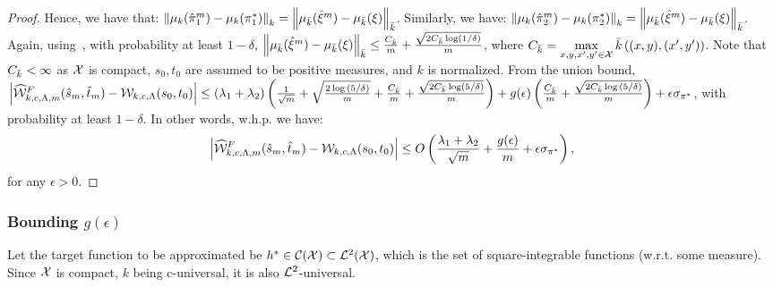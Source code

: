 \begin{proof}
Hence, we have that: $\left\|\mu_k(\hat{\pi}^m_1)-\mu_k(\pi^*_1)\right\|_k=\left\|\mu_{\bar{k}}(\hat{\xi}^m)-\mu_{\bar{k}}(\xi)\right\|_{\bar{k}}$. Similarly, we have: $\left\|\mu_k(\hat{\pi}^m_2)-\mu_k(\pi^*_2)\right\|_k=\left\|\mu_{\bar{k}}(\hat{\xi}^m)-\mu_{\bar{k}}(\xi)\right\|_{\bar{k}}$.  Again, using~\citet[Theorem~3.4]{Muandet_2017}, with probability at least $1-\delta$, $\left\|\mu_{\bar{k}}(\hat{\xi}^m)-\mu_{\bar{k}}(\xi)\right\|_{\bar{k}}\le\frac{C_{\bar{k}}}{{m}}+\frac{\sqrt{2C_{\bar{k}}\log({1/\delta})}}{m}$, where $C_{\bar{k}}=\max\limits_{x,y,x',y'\in\mathcal{X}}\bar{k}\left((x,y),(x',y')\right)$. Note that $C_{\bar{k}}<\infty$ as $\mathcal{X}$ is compact, $s_0,t_0$ are assumed to be positive measures, and $k$ is normalized.
From the union bound, $\left|\widehat{\mathcal{W}}^F_{k, c, \Lambda, m}(\hat{s}_m, \hat{t}_m)-\mathcal{W}_{k, c, \Lambda}(s_0, t_0)\right|\leq \left(\lambda_1+\lambda_2\right)\left(\frac{1}{\sqrt{m}}+\sqrt{\frac{2\log{(5/\delta)}}{m}}+\frac{C_{\bar{k}}}{{m}}+\frac{\sqrt{2C_{\bar{k}}\log({5/\delta})}}{m}\right)+g(\epsilon)\left(\frac{C_{\tilde{k}}}{{m}}+{\frac{\sqrt{2C_{\tilde{k}}\log{(5/\delta)}}}{m}}\right)+\epsilon\sigma_{\pi^*}$, with probability at least $1-\delta$. In other words, w.h.p. we have: $$\left|\widehat{\mathcal{W}}^F_{k, c, \Lambda, m}(\hat{s}_m, \hat{t}_m)-\mathcal{W}_{k, c, \Lambda}(s_0, t_0)\right|\leq O\left(\frac{\lambda_1+\lambda_2}{\sqrt{m}}+\frac{g(\epsilon)}{m}+\epsilon\sigma_{\pi^*}\right),$$ for any $\epsilon>0.$
\end{proof}


\subsubsection{Bounding $g(\epsilon)$}\label{app:bharath}
Let the target function to be approximated be $h^*\in\mathcal{C}(\mathcal{X})\subset\mathcal{L}^2(\mathcal{X})$, which is the set of square-integrable functions (w.r.t. some measure). Since $\mathcal{X}$ is compact, $k$ being c-universal, it is also $\mathcal{L}^2$-universal.

